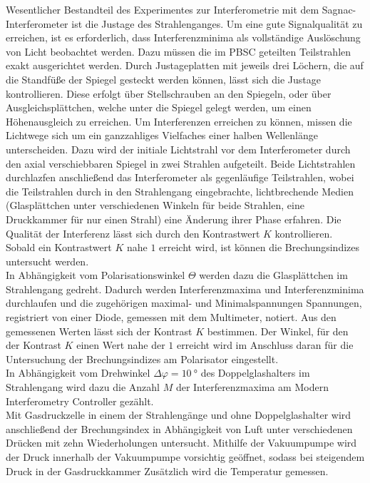 \label{durchfuehrung}
\noindent Wesentlicher Bestandteil des Experimentes zur Interferometrie mit dem
Sagnac-Interferometer ist die Justage des Strahlenganges. Um eine gute
Signalqualität zu erreichen, ist es erforderlich, dass Interferenzminima als
vollständige Auslöschung von Licht beobachtet werden. Dazu müssen die im PBSC
geteilten Teilstrahlen exakt ausgerichtet werden. Durch Justageplatten mit
jeweils drei Löchern, die auf die Standfüße der Spiegel gesteckt werden können,
lässt sich die Justage kontrollieren. Diese erfolgt über Stellschrauben an den
Spiegeln, oder über Ausgleichsplättchen, welche unter die Spiegel gelegt werden,
um einen Höhenausgleich zu erreichen. Um Interferenzen erreichen zu können,
missen die Lichtwege sich um ein ganzzahliges Vielfaches einer halben Wellenlänge
unterscheiden. Dazu wird der initiale Lichtstrahl vor dem Interferometer durch
den axial verschiebbaren Spiegel in zwei Strahlen aufgeteilt. Beide Lichtstrahlen
durchlazfen anschließend das Interferometer als gegenläufige Teilstrahlen, wobei
die Teilstrahlen durch in den Strahlengang eingebrachte, lichtbrechende Medien
(Glasplättchen unter verschiedenen Winkeln für beide Strahlen, eine Druckkammer
für nur einen Strahl) eine Änderung ihrer Phase erfahren. Die Qualität der
Interferenz lässt sich durch den Kontrastwert $K$ kontrollieren. Sobald ein
Kontrastwert $K$ nahe $1$ erreicht wird, ist können die Brechungsindizes
untersucht werden. \\
\noindent In Abhängigkeit vom Polarisationswinkel $\Theta$ werden dazu die
Glasplättchen im Strahlengang gedreht. Dadurch werden Interferenzmaxima und
Interferenzminima durchlaufen und die zugehörigen maximal- und Minimalspannungen
Spannungen, registriert von einer Diode, gemessen mit dem Multimeter, notiert.
Aus den gemessenen Werten lässt sich der Kontrast $K$ bestimmen. Der Winkel, für
den der Kontrast $K$ einen Wert nahe der $1$ erreicht wird im Anschluss daran für
die Untersuchung der Brechungsindizes am Polarisator eingestellt. \\
\noindent In Abhängigkeit vom Drehwinkel $\Delta \varphi = \SI{10}{\degree}$ des
Doppelglashalters im Strahlengang wird dazu die Anzahl $M$ der Interferenzmaxima
am Modern Interferometry Controller gezählt.  \\
\noindent Mit Gasdruckzelle in einem der Strahlengänge und ohne Doppelglashalter
wird anschließend der Brechungsindex in Abhängigkeit von Luft unter verschiedenen
Drücken mit zehn Wiederholungen untersucht. Mithilfe der Vakuumpumpe wird der Druck innerhalb der
Vakuumpumpe vorsichtig geöffnet, sodass bei steigendem Druck in der Gasdruckkammer
Zusätzlich wird die Temperatur gemessen.
